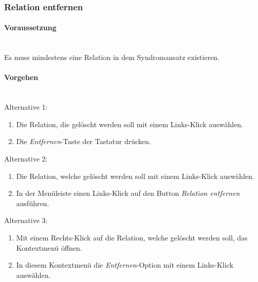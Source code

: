 \documentclass[enabledeprecatedfontcommands,fontsize=11pt,paper=a4,twoside]{scrartcl}
\newcommand*{\condition}{\paragraph{Voraussetzung}$\;$ \vspace{0.2cm}\\}
\newcommand*{\actions}{\paragraph{Vorgehen} $\;$\vspace{0.2cm}\\}
\begin{document}
		\subsubsection{Relation entfernen}
		\condition
		Es muss mindestens eine Relation in dem Syndromansatz existieren. 
		\actions
		Alternative 1:
		\begin{enumerate}
			\item Die Relation, die gelöscht werden soll mit einem Links-Klick auswählen.
			\item Die \textit{Entfernen}-Taste der Tastatur drücken.
		\end{enumerate}
		Alternative 2:
		\begin{enumerate}
			\item Die Relation, welche gelöscht werden soll mit einem Links-Klick auswählen.
			\item In der Menüleiste einen Links-Klick auf den Button \textit{Relation entfernen} ausführen.
		\end{enumerate}
		Alternative 3:
		\begin{enumerate}
			\item Mit einem Rechts-Klick auf die Relation, welche gelöscht werden soll, das Kontextmenü öffnen. 
			\item In diesem Kontextmenü die \textit{Entfernen}-Option mit einem Links-Klick auswählen.
		\end{enumerate}
	
		
\end{document}
